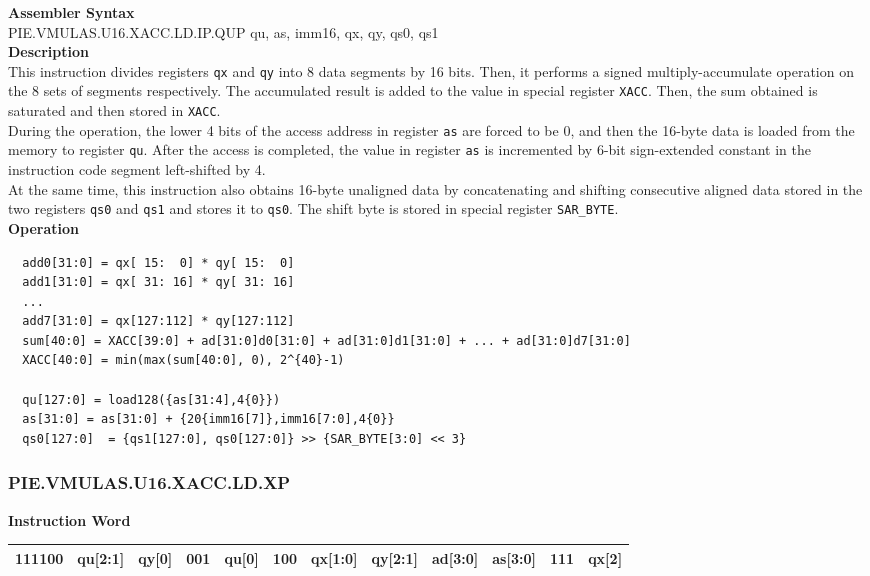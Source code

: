\textbf{Assembler Syntax} \\
PIE.VMULAS.U16.XACC.LD.IP.QUP qu, as, imm16, qx, qy, qs0, qs1 \\
\textbf{Description} \\
This instruction divides registers \lstinline{qx} and \lstinline{qy} into 8 data segments by 16 bits. Then, it performs a signed multiply-accumulate operation on the 8 sets of segments respectively. The accumulated result is added to the value in special register \lstinline{XACC}. Then, the sum obtained is saturated and then stored in \lstinline{XACC}.\\
During the operation, the lower 4 bits of the access address in register \lstinline{as} are forced to be 0, and then the 16-byte data is loaded from the memory to register \lstinline{qu}. After the access is completed, the value in register \lstinline{as} is incremented by 6-bit sign-extended constant in the instruction code segment left-shifted by 4.\\
At the same time, this instruction also obtains 16-byte unaligned data by concatenating and shifting consecutive aligned data stored in the two registers \lstinline{qs0} and \lstinline{qs1} and stores it to \lstinline{qs0}. The shift byte is stored in special register \lstinline{SAR_BYTE}.\\
\textbf{Operation}
\begin{lstlisting}
  add0[31:0] = qx[ 15:  0] * qy[ 15:  0]
  add1[31:0] = qx[ 31: 16] * qy[ 31: 16]
  ...
  add7[31:0] = qx[127:112] * qy[127:112]
  sum[40:0] = XACC[39:0] + ad[31:0]d0[31:0] + ad[31:0]d1[31:0] + ... + ad[31:0]d7[31:0]
  XACC[40:0] = min(max(sum[40:0], 0), 2^{40}-1)

  qu[127:0] = load128({as[31:4],4{0}})
  as[31:0] = as[31:0] + {20{imm16[7]},imm16[7:0],4{0}}
  qs0[127:0]  = {qs1[127:0], qs0[127:0]} >> {SAR_BYTE[3:0] << 3}
\end{lstlisting}

\newpage
\subsubsection{PIE.VMULAS.U16.XACC.LD.XP}\label{instruction:PIEVMULASU16XACCLDXP}
\setlength\tabcolsep{6pt}
\textbf{Instruction Word} \\
\begin{tabular}{|c|c|c|c|c|c|c|c|c|c|c|c|}
	\hline
	111100 & qu[2:1] & qy[0] & 001 & qu[0] & 100 & qx[1:0] & qy[2:1] & ad[3:0] & as[3:0] & 111 & qx[2] \\
	\hline
\end{tabular}

